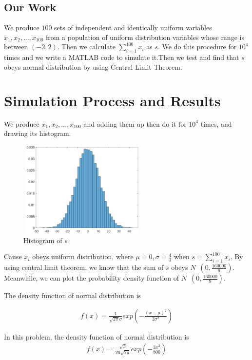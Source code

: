 \documentclass[conference]{IEEEtran}
\begin{document}
\subsection{Our Work}
We produce $100$ sets of independent and identically uniform variables $x_1, x_2, ..., x_{100}$ from a population of uniform distribution variables whose range is between $(-2,2)$. Then we calculate $\sum_{i=1}^{100}x_i$ as $s$. We do this procedure for $10^4$ times and we write a MATLAB code to simulate it.Then we test and find that $s$ obeys normal distribution by using Central Limit Theorem. 



\section{Simulation Process and Results}
We produce $x_1, x_2, ...,x_{100}$ and adding them up then do it for $10^4$ times, and drawing its histogram.
\begin{figure}[htbp]
\centering
\includegraphics[height=48mm,width=64mm]{Histogram.eps}
\caption{Histogram of $s$}
\centering
\label{fig:System_Model} \vspace{2mm}
\end{figure}

Cause $x_{i}$ obeys uniform distribution, where $\mu = 0, \sigma = \frac{4}{3}$ when $s = \sum_{i = 1}^{100}x_i$. By using central limit theorem, we know that the sum of $s$ obeys $N$~$(0,\frac{160000}{9})$. Meanwhile, we can plot the probability density function of $N$~$(0,\frac{160000}{9})$.

The density function of normal distribution is

\begin{align}
	f(x)=\frac{1}{\sqrt{2\pi}\sigma}exp\left(-\frac{(x-\mu)^2}{2\sigma^2}\right)
\end{align}

In this problem, the density function of normal distribution is
\begin{align}
	f(x)=\frac{\sqrt{3}}{20\sqrt{2\pi}}exp\left(-\frac{3 x^2}{800}\right)
\end{align}
\end{document}
